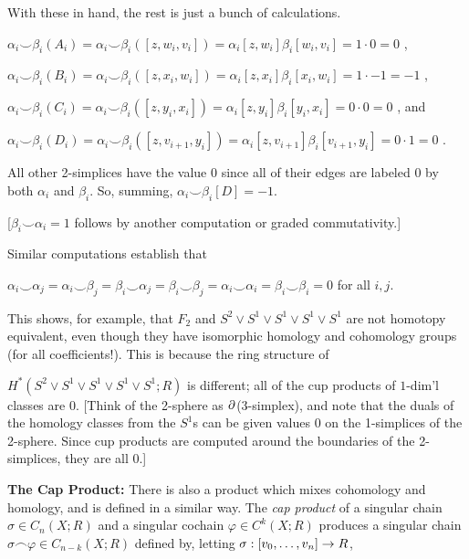 \ssk


\ssk

With these in hand, the rest is just a bunch of calculations.

\vfill
\eject


\ssk

$\alpha_i\smile\beta_i(A_i)=\alpha_i\smile\beta_i([z,w_i,v_i])=\alpha_i[z,w_i]\beta_i[w_i,v_i]=1\cdot 0=0$ , 

$\alpha_i\smile\beta_i(B_i)=\alpha_i\smile\beta_i([z,x_i,w_i])=\alpha_i[z,x_i]\beta_i[x_i,w_i]=1\cdot -1=-1$ ,

$\alpha_i\smile\beta_i(C_i)=\alpha_i\smile\beta_i([z,y_i,x_i])=\alpha_i[z,y_i]\beta_i[y_i,x_i]=0\cdot 0=0$ , and

$\alpha_i\smile\beta_i(D_i)=\alpha_i\smile\beta_i([z,v_{i+1},y_i])=\alpha_i[z,v_{i+1}]\beta_i[v_{i+1},y_i]=0\cdot 1=0$ .

All other 2-simplices have the value $0$ since all of their edges are labeled $0$ by both $\alpha_i$ and $\beta_i$.
So, summing, $\alpha_i\smile\beta_i[D]=-1$. 

[$\beta_i\smile\alpha_i = 1$ follows by another computation or graded commutativity.] 

Similar computations establish that 

\ssk

$\alpha_i\smile\alpha_j = \alpha_i\smile\beta_j = \beta_i\smile\alpha_j = \beta_i\smile\beta_j = \alpha_i\smile\alpha_i = \beta_i\smile\beta_i = 0$
for all $i,j$.

\msk

This shows, for example, that $F_2$ and $S^2\vee S^1\vee S^1\vee S^1\vee S^1$ are not homotopy equivalent,
even though they have isomorphic homology and cohomology groups (for all coefficients!). This is because the ring structure
of 

$H^*(S^2\vee S^1\vee S^1\vee S^1\vee S^1;R)$ is different; all of the cup products of $1$-dim'l classes are $0$.
[Think of the 2-sphere as $\partial$(3-simplex), and note that the duals of the homology classes from the $S^1$s
can be given values $0$ on the 1-simplices of the 2-sphere. Since cup products are computed around the boundaries
of the 2-simplices, they are all $0$.]

\vfill
\eject

{\bf The Cap Product:} There is also a product which mixes cohomology and homology, and is defined in a similar way. The {\it cap product}
of a singular chain $\sigma\in C_n(X;R)$ and a singular cochain $\varphi\in C^k(X;R)$ produces a singular chain
$\sigma\frown\varphi\in C_{n-k}(X;R)$ defined by, letting $\sigma:[v_0,\ldots,v_n]\rightarrow R$,

